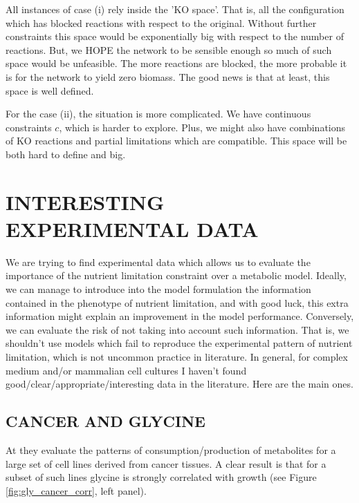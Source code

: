 \documentclass[
10pt, %
a4paper, %
oneside, %
headinclude,footinclude, %
BCOR5mm, %
]{scrartcl}
\begin{document}
All instances of case (i) rely inside the 'KO space'.
That is, all the configuration which has blocked reactions with respect to the original.
Without further constraints this space would be exponentially big with respect to the number of reactions.
But, we HOPE the network to be sensible enough so much of such space would be unfeasible.
The more reactions are blocked, the more probable it is for the network to yield zero biomass.
The good news is that at least, this space is well defined.

For the case (ii), the situation is more complicated.
We have continuous constraints $c$, which is harder to explore.
Plus, we might also have combinations of KO reactions and partial limitations which are compatible.
This space will be both hard to define and big.

\section{INTERESTING EXPERIMENTAL DATA}

We are trying to find experimental data which allows us to evaluate the importance of the nutrient limitation constraint over a metabolic model.
Ideally, we can manage to introduce into the model formulation the information contained in the phenotype of nutrient limitation, and with good luck,
this extra information might explain an improvement in the model performance.
Conversely, we can evaluate the risk of not taking into account such information.
That is, we shouldn't use models which fail to reproduce the experimental pattern of nutrient limitation, which is not uncommon practice in literature.
In general, for complex medium and/or mammalian cell cultures I haven't found good/clear/appropriate/interesting data in the literature.
Here are the main ones.

\subsection{CANCER AND GLYCINE}

At \cite{jainMetaboliteProfilingIdentifies2012} they evaluate the patterns of consumption/production of metabolites for a large set of cell lines
derived from cancer tissues.
A clear result is that for a subset of such lines glycine is strongly correlated with growth (see Figure \ref{fig:gly_cancer_corr}, left panel).

\end{document}
